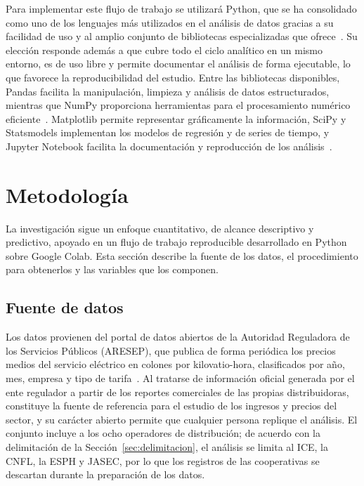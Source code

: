 \documentclass[conference]{IEEEtran}
\begin{document}
Para implementar este flujo de trabajo se utilizará Python, que se ha consolidado como uno de los lenguajes más utilizados en el análisis de datos gracias a su facilidad de uso y al amplio conjunto de bibliotecas especializadas que ofrece~\cite{r17}. Su elección responde además a que cubre todo el ciclo analítico en un mismo entorno, es de uso libre y permite documentar el análisis de forma ejecutable, lo que favorece la reproducibilidad del estudio. Entre las bibliotecas disponibles, Pandas facilita la manipulación, limpieza y análisis de datos estructurados, mientras que NumPy proporciona herramientas para el procesamiento numérico eficiente~\cite{r17}. Matplotlib permite representar gráficamente la información, SciPy y Statsmodels implementan los modelos de regresión y de series de tiempo, y Jupyter Notebook facilita la documentación y reproducción de los análisis~\cite{r18}.

\section{Metodolog\'ia}
\label{sec:metodologia}
La investigaci\'on sigue un enfoque cuantitativo, de alcance descriptivo y predictivo, apoyado en un flujo de trabajo reproducible desarrollado en Python sobre Google Colab. Esta secci\'on describe la fuente de los datos, el procedimiento para obtenerlos y las variables que los componen.

\subsection{Fuente de datos}

Los datos provienen del portal de datos abiertos de la Autoridad Reguladora de los Servicios P\'ublicos (ARESEP), que publica de forma peri\'odica los precios medios del servicio el\'ectrico en colones por kilovatio-hora, clasificados por a\~no, mes, empresa y tipo de tarifa~\cite{r6}. Al tratarse de informaci\'on oficial generada por el ente regulador a partir de los reportes comerciales de las propias distribuidoras, constituye la fuente de referencia para el estudio de los ingresos y precios del sector, y su car\'acter abierto permite que cualquier persona replique el an\'alisis. El conjunto incluye a los ocho operadores de distribuci\'on; de acuerdo con la delimitaci\'on de la Secci\'on~\ref{sec:delimitacion}, el an\'alisis se limita al ICE, la CNFL, la ESPH y JASEC, por lo que los registros de las cooperativas se descartan durante la preparaci\'on de los datos.
\end{document}
